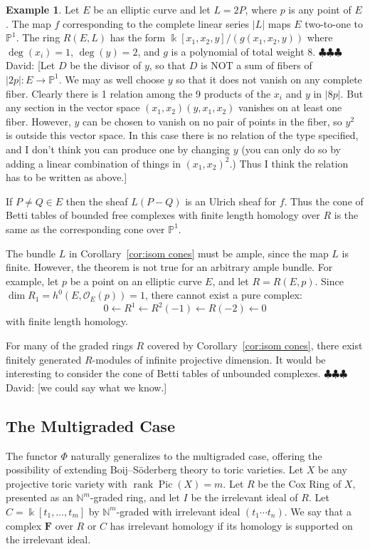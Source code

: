 \documentclass[12pt]{amsart}
\theoremstyle{definition}
\newtheorem{example}[lemma]{Example}
\theoremstyle{remark}
\newcommand{\Pic}{\operatorname{Pic}}
\newcommand{\kk}{\Bbbk}
\newcommand{\rank}{\operatorname{rank}}
\newcommand{\cO}{\mathcal{O}}
\newcommand{\FF}{\mathbf{F}}
\newcommand{\defi}[1]{\textsf{#1}} %
\newcommand{\daniel}[1]{{\color{green} \sf $\clubsuit\clubsuit\clubsuit$ Daniel: [#1]}}
\newcommand{\david}[1]{{\color{red} \sf $\clubsuit\clubsuit\clubsuit$ David: [#1]}}
\renewcommand{\P}{{\mathbb P}}
\begin{document}
\begin{example}\label{ex:elliptic}
Let $E$ be an elliptic curve and let $L=2P$, where $p$ is any point of $E$.  The map $f$ corresponding to the complete
linear series $|L|$ maps $E$ two-to-one to $\P^{1}$. The ring $R(E,L)$ has the form
$\kk[x_1,x_2,y]/(g(x_{1},x_{2},y))$  where $\deg(x_i)=1$, $\deg(y)=2$, and $g$ is a polynomial
of total weight 8.
%
\david{Let $D$ be the divisor of $y$, so that
$D$ is NOT a sum of fibers of $|2p|: E\to \P^{1}$. We may as well choose $y$ so that it does not
vanish on any complete fiber. Clearly there is 1 relation among the 9 products of the $x_{i}$ and $y$ in $|8p|$. But any section in the vector space $(x_{1}, x_{2})(y, x_{1}, x_{2})$ vanishes
on at least one fiber. However, $y$ can be chosen to vanish on no pair of points in the fiber, so $y^{2}$ is outside this vector space. In this case there is no relation of the type specified,
and I don't think you can produce one by changing $y$ (you can only do so by adding a linear
combination of things in $(x_{1}, x_{2})^{2}$.) Thus I think the relation has to be written
as above.}

If $P\neq Q\in E$ then the sheaf $L(P-Q)$ is an Ulrich sheaf for $f$. Thus the cone of
Betti tables of bounded free complexes with finite length homology over $R$ is the same
as the corresponding cone over $\P^{1}$.

The bundle $L$ in Corollary~\ref{cor:isom cones} must be ample, since the map $L$ is finite.  However, the theorem is not true for an arbitrary ample bundle.  For example, let $p$ be a point on an elliptic curve $E$, and let $R=R(E,p)$.  Since $\dim R_1=h^0(E,\cO_E(p))=1$, there cannot exist a pure complex:
\[
0\gets R^1\gets R^2(-1)\gets R(-2)\gets 0
\]
with finite length homology.
\end{example}

For many of the graded rings $R$ covered by Corollary~\ref{cor:isom cones}, there exist finitely generated $R$-modules of infinite projective dimension.  It would  be interesting to consider the cone of Betti tables of unbounded complexes. \david{we could say what we know.}

\subsection*{The Multigraded Case}
The functor $\Phi$ naturally generalizes to the multigraded case, offering the possibility of extending Boij--S\"oderberg theory to toric varieties.  Let $X$ be any projective toric variety with $\rank \Pic(X)=m$.  Let $R$ be the Cox Ring of $X$, presented as an $\mathbb N^m$-graded ring, and let $I$ be the irrelevant ideal of $R$.  Let $C=\kk[t_1, \dots, t_m]$ by $\mathbb N^m$-graded with irrelevant ideal $(t_1\cdots t_n)$.  We say that a complex $\FF$ over $R$ or $C$ has \defi{irrelevant homology} if its homology is supported on the irrelevant ideal.
\end{document}
